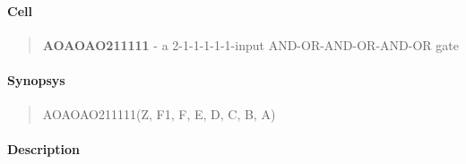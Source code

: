 \label{AOAOAO211111}
\paragraph{Cell}
\begin{quote}
    \textbf{AOAOAO211111} - a 2-1-1-1-1-1-input AND-OR-AND-OR-AND-OR gate
\end{quote}

\paragraph{Synopsys}
\begin{quote}
    AOAOAO211111(Z, F1, F, E, D, C, B, A)
\end{quote}

\paragraph{Description}

%

